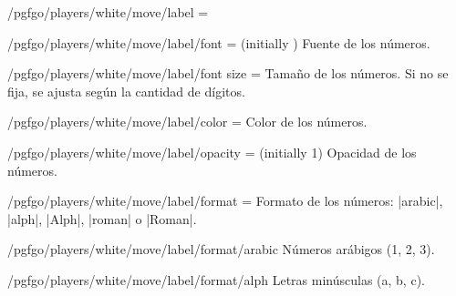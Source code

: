 \begin{goban}[9, stone = {radius = 4pt}, mark = {line = {color = red}}]
\begin{key}{/pgfgo/players/white/move/label = }
	\begin{codeexample}[width=4cm]

		\begin{goban}[3]
		\end{goban}
	\end{codeexample}
\end{key}

\begin{key}{/pgfgo/players/white/move/label/font =  (initially \texttt{\string\bfseries})}
	Fuente de los números.
\end{key}

\begin{key}{/pgfgo/players/white/move/label/font size = }
	Tamaño de los números. Si no se fija, se ajusta según la cantidad de dígitos.
\end{key}

\begin{key}{/pgfgo/players/white/move/label/color = }
	Color de los números.
\end{key}

\begin{key}{/pgfgo/players/white/move/label/opacity =  (initially 1)}
	Opacidad de los números.
\end{key}

\begin{key}{/pgfgo/players/white/move/label/format = }
	Formato de los números: |arabic|, |alph|, |Alph|, |roman| o |Roman|.

	\begin{codeexample}[width=4cm]

		\begin{goban}[3]
		\end{goban}
	\end{codeexample}
\end{key}

\begin{key}{/pgfgo/players/white/move/label/format/arabic}
	Números arábigos (1, 2, 3).
\end{key}

\begin{key}{/pgfgo/players/white/move/label/format/alph}
	Letras minúsculas (a, b, c).
\end{key}


\end{goban}
